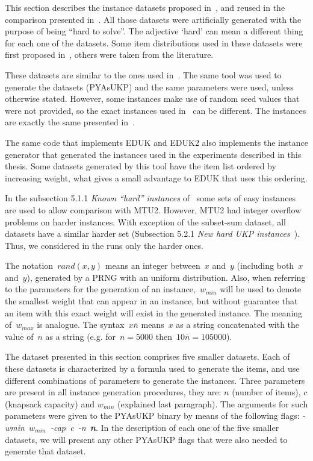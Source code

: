 This section describes the instance datasets proposed in~\cite{pya}, and reused in the comparison presented in~\cite{sea2016}.
All those datasets were artificially generated with the purpose of being ``hard to solve''.
The adjective `hard' can mean a different thing for each one of the datasets. 
Some item distributions used in these datasets were first proposed in~\cite{pya}, others were taken from the literature.

These datasets are similar to the ones used in~\cite{pya}.
The same tool was used to generate the datasets (PYAsUKP) and the same parameters were used, unless otherwise stated.
However, some instances make use of random seed values that were not provided, so the exact instances used in~\cite{pya} can be different.
The instances are exactly the same presented in~\cite{sea2016}.

The same code that implements EDUK and EDUK2 also implements the instance generator that generated the instances used in the experiments described in this thesis.
Some datasets generated by this tool have the item list ordered by increasing weight, what gives a small advantage to EDUK that uses this ordering.

In the subsection 5.1.1 \emph{Known ``hard'' instances} of~\cite{pya} some sets of easy instances are used to allow comparison with MTU2. 
However, MTU2 had integer overflow problems on harder instances. 
With exception of the subset-sum dataset, all datasets have a similar harder set (Subsection 5.2.1 \emph{New hard UKP instances}~\cite{pya}).
Thus, we considered in the runs only the harder ones. 

The notation~\(rand(x, y)\) means an integer between~\(x\) and~\(y\) (including both~\(x\) and~\(y\)), generated by a PRNG with an uniform distribution.
Also, when referring to the parameters for the generation of an instance,~\(w_{min}\) will be used to denote the smallest weight that can appear in an instance, but without guarantee that an item with this exact weight will exist in the generated instance.
The meaning of~\(w_{max}\) is analogue.
The syntax~\(x\overline{n}\) means~\(x\) as a string concatenated with the value of~\(n\) as a string (e.g. for~\(n = 5000\) then~\(10\overline{n} = 105000\)).

The dataset presented in this section comprises five smaller datasets.
Each of these datasets is characterized by a formula used to generate the items, and use different combinations of parameters to generate the instances.
Three parameters are present in all instance generation procedures, they are: \(n\) (number of items), \(c\) (knapsack capacity) and \(w_{min}\) (explained last paragraph).
The arguments for such parameters were given to the PYAsUKP binary by means of the following flags: \mbox{\emph{-wmin~\(w_{min}\) -cap c -n \textbf{n}}}.
In the description of each one of the five smaller datasets, we will present any other PYAsUKP flags that were also needed to generate that dataset.

